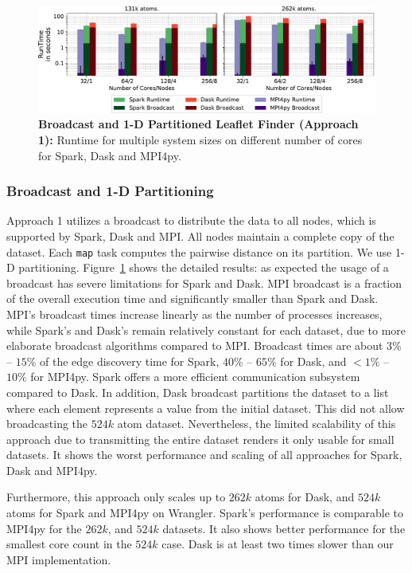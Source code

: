 \begin{figure}[ht]
    \centering
    \includegraphics[width=.95\textwidth]{figures/data_analytics_hpc/task_par/spark_dask_lf_approach1.pdf}
    \caption{\textbf{Broadcast and 1-D Partitioned Leaflet Finder (Approach 1):}
    Runtime for multiple system sizes on different number of cores for Spark, Dask and MPI4py.}
    \label{fig:WranglerLeafLetFinderApp1}
\end{figure}

\subsubsection{Broadcast and 1-D Partitioning}
Approach 1 utilizes a broadcast to distribute the data to all nodes, which is supported by Spark, Dask and MPI.
All nodes maintain a complete copy of the dataset.
Each \texttt{map} task computes the pairwise distance on its partition.
We use 1-D partitioning.
Figure~\ref{fig:WranglerLeafLetFinderApp1} shows the detailed results: as expected the usage of a broadcast has severe limitations for Spark and Dask.
MPI broadcast is a fraction of the overall execution time and significantly smaller than Spark and Dask.
MPI's broadcast times increase linearly as the number of processes increases, while Spark's and Dask's remain relatively constant for each dataset, due to more elaborate broadcast algorithms compared to MPI.
Broadcast times are about $3\%$ -- $15\%$ of the edge discovery time for Spark, $40\%$ -- $65\%$ for Dask, and $<1\%$ -- $10\%$ for MPI4py.
Spark offers a more efficient communication subsystem compared to Dask.
In addition, Dask broadcast partitions the dataset to a list where each element represents a value from the initial dataset.
This did not allow broadcasting the $524k$ atom dataset.
Nevertheless, the limited scalability of this approach due to transmitting the entire dataset renders it only usable for small datasets.
It shows the worst performance and scaling of all approaches for Spark, Dask and MPI4py.

Furthermore, this approach only scales up to $262k$ atoms for Dask, and $524k$ atoms for Spark and MPI4py on Wrangler.
Spark's performance is comparable to MPI4py for the $262k$, and $524k$ datasets.
It also shows better performance for the smallest core count in the $524k$ case.
Dask is at least two times slower than our MPI implementation.


